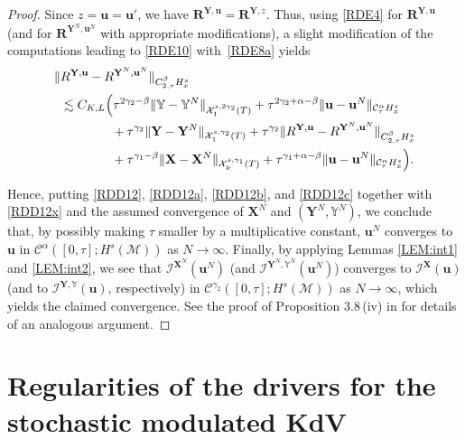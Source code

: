 \documentclass[letterpaper, 11pt,  reqno]{amsart}
\newcommand{\1}{\hspace{0.5mm}\textup{I}\hspace{0.5mm}}
\newcommand{\I}{\mathcal{I}}
\newcommand{\noi}{\noindent}
\newcommand{\CC}{\mathcal{C}}
\newcommand{\RR}{\mathbf{R}}
\newcommand{\al}{\alpha}
\newcommand{\be}{\beta}
\newcommand{\g}{\gamma}
\newcommand{\les}{\lesssim}
\newcommand{\M}{\mathcal{M}}
\newcommand{\cX}{\mathcal{X}}
\newcommand{\uu}{\mathbf{u}}
\newcommand{\YYb}{\mathbb{Y}}
\newcommand{\XX}{\mathbf{X}}
\newcommand{\YY}{\mathbf{Y}}
\numberwithin{equation}{section}
\numberwithin{theorem}{section}
\begin{document}
\begin{proof}
\noi
Since $z = \uu = \uu'$, 
we have $\RR^{\YY, \uu} = \RR^{\YY, z}$.
Thus, using
\eqref{RDE4}
for $\RR^{\YY, \uu}$ (and for $\RR^{\YY^N, \uu^N}$ with appropriate modifications),
a slight modification of the computations leading to \eqref{RDE10} 
with~\eqref{RDE8a} 
yields
\begin{align}
\begin{split}
 \| & R^{\YY, \uu} - R^{\YY^N, \uu^N}\|_{C^\be_{2,\tau}H^s_x}\\
& 
\les 
C_{K, L} \Big( \tau^{2\g_2  - \be} \|\YYb- \YYb^N\|_{\cX^{s, 2\g_2}_1(T)}
+ 
\tau^{2\g_2 + \al - \be} 
\|\uu -\uu^N\|_{\CC^\al_\tau H^s_x}\\
& \quad 
\hphantom{lXXX}+ 
\tau^{\g_2}
\|\YY - \YY^N\|_{\cX^{s, \g_2}_1(T)}
+ \tau^{\g_2}
\| R^{\YY, \uu} - R^{\YY^N, \uu^N}\|_{C^\be_{2, \tau } H^s_x}\\
& \quad  \hphantom{lXXX} + 
\tau^{\g_1  - \be}\|\XX - \XX^N\|_{\cX^{s, \g_1}_k(T)}
+  \tau^{\g_1 +\al - \be}
\|\uu- \uu^N\|_{\CC^\al_\tau H^s_x}\Big).
\end{split}
\label{RDD12c}
\end{align}


Hence, putting \eqref{RDD12}, \eqref{RDD12a}, \eqref{RDD12b}, 
and \eqref{RDD12c}
together with \eqref{RDD12x}
and the assumed convergence of $\XX^N$ and $(\YY^N, \YYb^N)$, 
we conclude that, by possibly making $\tau$ smaller by a multiplicative constant, 
$\uu^N$ converges to $\uu$
 in $\CC^{\al}([0, \tau]; H^s(\M))$
 as $N \to \infty$.
Finally, 
by applying
Lemmas \ref{LEM:int1} and \ref{LEM:int2}, 
we see that 
$ \I^{\XX^N}(\uu^N)$
(and $\I^{\YY^N, \YYb^N}(\uu^N)$)
converges
to 
$ \I^{\XX}(\uu)$
(and to $\I^{\YY, \YYb}(\uu)$, respectively)
 in $\CC^{\g_2}([0, \tau]; H^s(\M))$
as $N \to \infty$, 
which yields the claimed convergence.
See the proof of Proposition 3.8\,(iv) in \cite{CGLLO1}
for details of an analogous argument.
\end{proof}


























\section{Regularities of the drivers
for the stochastic modulated KdV}
\label{SEC:driver}
\end{document}
